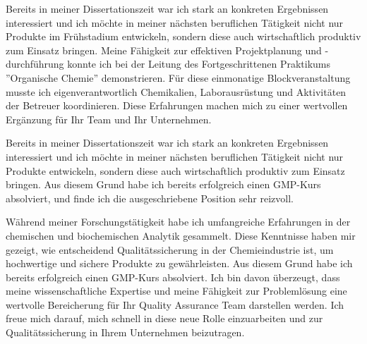     {Bereits in meiner Dissertationszeit war ich stark an konkreten Ergebnissen interessiert und ich möchte in meiner nächsten beruflichen Tätigkeit nicht nur Produkte im Frühstadium entwickeln, sondern diese auch wirtschaftlich produktiv zum Einsatz bringen. Meine Fähigkeit zur effektiven Projektplanung und -durchführung konnte ich bei der Leitung des Fortgeschrittenen Praktikums ''Organische Chemie'' demonstrieren. Für diese einmonatige Blockveranstaltung musste ich eigenverantwortlich Chemikalien, Laborausrüstung und Aktivitäten der Betreuer koordinieren. Diese Erfahrungen machen mich zu einer wertvollen Ergänzung für Ihr Team und Ihr Unternehmen.
    \par }{}
    {Bereits in meiner Dissertationszeit war ich stark an konkreten Ergebnissen interessiert und ich möchte in meiner nächsten beruflichen Tätigkeit nicht nur Produkte entwickeln, sondern diese auch wirtschaftlich produktiv zum Einsatz bringen. Aus diesem Grund habe ich bereits erfolgreich einen GMP-Kurs absolviert, und finde ich die ausgeschriebene Position sehr reizvoll.\par }{}
    {Während meiner Forschungstätigkeit habe ich umfangreiche Erfahrungen in der chemischen und biochemischen Analytik gesammelt. Diese Kenntnisse haben mir gezeigt, wie entscheidend Qualitätssicherung in der Chemieindustrie ist, um hochwertige und sichere Produkte zu gewährleisten. Aus diesem Grund habe ich bereits erfolgreich einen GMP-Kurs absolviert. Ich bin davon überzeugt, dass meine wissenschaftliche Expertise und meine Fähigkeit zur Problemlösung eine wertvolle Bereicherung für Ihr Quality Assurance Team darstellen werden. Ich freue mich darauf, mich schnell in diese neue Rolle einzuarbeiten und zur Qualitätssicherung in Ihrem Unternehmen beizutragen.\par }{}
